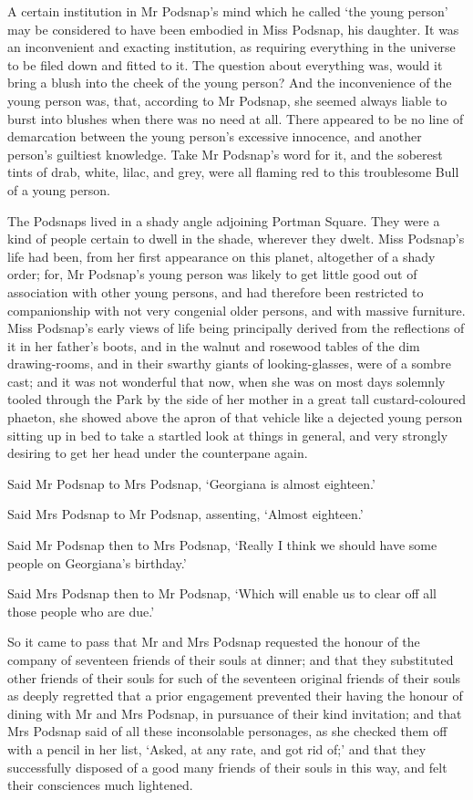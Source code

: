 A certain institution in Mr Podsnap’s mind which he called ‘the young
person’ may be considered to have been embodied in Miss Podsnap, his
daughter. It was an inconvenient and exacting institution, as requiring
everything in the universe to be filed down and fitted to it. The
question about everything was, would it bring a blush into the cheek of
the young person? And the inconvenience of the young person was, that,
according to Mr Podsnap, she seemed always liable to burst into
blushes when there was no need at all. There appeared to be no line of
demarcation between the young person’s excessive innocence, and another
person’s guiltiest knowledge. Take Mr Podsnap’s word for it, and the
soberest tints of drab, white, lilac, and grey, were all flaming red to
this troublesome Bull of a young person.

The Podsnaps lived in a shady angle adjoining Portman Square. They were
a kind of people certain to dwell in the shade, wherever they dwelt.
Miss Podsnap’s life had been, from her first appearance on this planet,
altogether of a shady order; for, Mr Podsnap’s young person was likely
to get little good out of association with other young persons, and had
therefore been restricted to companionship with not very congenial older
persons, and with massive furniture. Miss Podsnap’s early views of life
being principally derived from the reflections of it in her father’s
boots, and in the walnut and rosewood tables of the dim drawing-rooms,
and in their swarthy giants of looking-glasses, were of a sombre cast;
and it was not wonderful that now, when she was on most days solemnly
tooled through the Park by the side of her mother in a great tall
custard-coloured phaeton, she showed above the apron of that vehicle
like a dejected young person sitting up in bed to take a startled look
at things in general, and very strongly desiring to get her head under
the counterpane again.

Said Mr Podsnap to Mrs Podsnap, ‘Georgiana is almost eighteen.’

Said Mrs Podsnap to Mr Podsnap, assenting, ‘Almost eighteen.’

Said Mr Podsnap then to Mrs Podsnap, ‘Really I think we should have some
people on Georgiana’s birthday.’

Said Mrs Podsnap then to Mr Podsnap, ‘Which will enable us to clear off
all those people who are due.’

So it came to pass that Mr and Mrs Podsnap requested the honour of the
company of seventeen friends of their souls at dinner; and that they
substituted other friends of their souls for such of the seventeen
original friends of their souls as deeply regretted that a prior
engagement prevented their having the honour of dining with Mr and Mrs
Podsnap, in pursuance of their kind invitation; and that Mrs Podsnap
said of all these inconsolable personages, as she checked them off with
a pencil in her list, ‘Asked, at any rate, and got rid of;’ and that
they successfully disposed of a good many friends of their souls in this
way, and felt their consciences much lightened.

